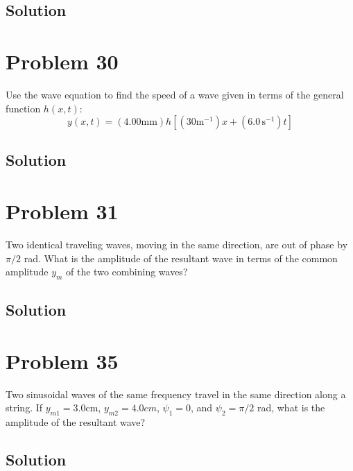 \documentclass[12pt]{article}
\begin{document}
        \subsection{Solution}

    \section{Problem 30}
        Use the wave equation to find the speed of a wave given in terms of the general function $h(x, t)$:
        \begin{equation}
            y(x, t) = (4.00 \unit{\milli\meter}) h[(30 \unit{\meter^{-1}})x + (6.0\,\unit{\second^{-1}})t]
        \end{equation}

        \subsection{Solution}

    \section{Problem 31}
        Two identical traveling waves, moving in the same direction, are out of phase by $\pi/2$ rad. 
        What is the amplitude of the resultant wave in terms of the common amplitude $y_m$ of the two combining waves?

        \subsection{Solution}

    \section{Problem 35}
        Two sinusoidal waves of the same frequency travel in the same direction along a string. 
        If $y_{m1} = 3.0 \unit{\centi\meter}$, $y_{m2} = 4.0 cm$, $\psi_1 = 0$, and $\psi_2 = \pi/2$ rad, what is the amplitude of the resultant wave?

        \subsection{Solution}

\end{document}
